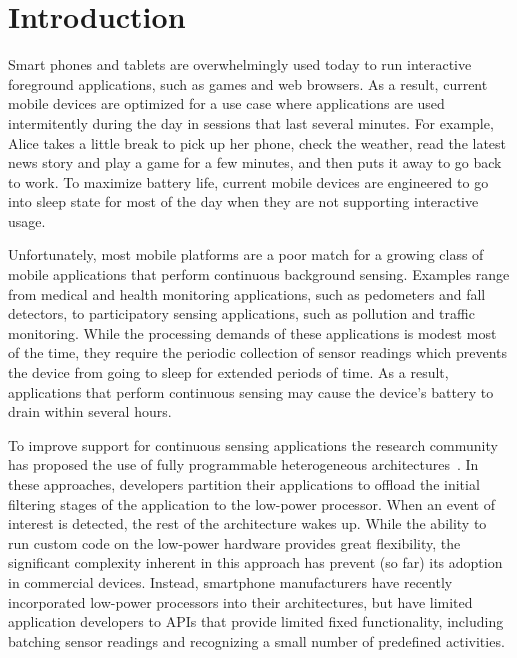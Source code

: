 
\section{\label{sec:Introduction}Introduction}

Smart phones and tablets are overwhelmingly used today to run
interactive foreground applications, such as games and web browsers.
As a result, current mobile devices are optimized for a use case where
applications are used intermitently during the day in sessions that
last several minutes.  For example, Alice takes a little break to pick
up her phone, check the weather, read the latest news story and play a
game for a few minutes, and then puts it away to go back to work.  To
maximize battery life, current mobile devices are engineered to go into
sleep state for most of the day when they are not supporting
interactive usage.

Unfortunately, most mobile platforms are a poor match for a growing
class of mobile applications that perform continuous background
sensing.  Examples range from medical and health monitoring
applications, such as pedometers and fall detectors, to participatory
sensing applications, such as pollution and traffic monitoring.  While
the processing demands of these applications is modest most of the
time, they require the periodic collection of sensor readings which
prevents the device from going to sleep for extended periods of time.
As a result, applications that perform continuous sensing may cause
the device's battery to drain within several hours.

To improve support for continuous sensing applications the research
community has proposed the use of fully programmable heterogeneous
architectures~\cite{reflex}.  In these approaches, developers
partition their applications to offload the initial filtering stages
of the application to the low-power processor.  When an event of
interest is detected, the rest of the architecture wakes up.  While
the ability to run custom code on the low-power hardware provides
great flexibility, the significant complexity inherent in this
approach has prevent (so far) its adoption in commercial devices.
Instead, smartphone manufacturers have recently incorporated low-power
processors into their architectures, but have limited application
developers to APIs that provide limited fixed functionality, including
batching sensor readings and recognizing a small number of predefined
activities.

